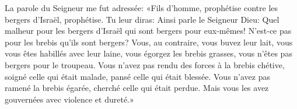 La parole du Seigneur me fut adressée:
	«Fils d’homme, prophétise contre les bergers d’Israël, prophétise.
Tu leur diras: Ainsi parle le Seigneur Dieu:
	Quel malheur pour les bergers d’Israël qui sont bergers pour eux-mêmes!
	N’est-ce pas pour les brebis qu’ils sont bergers?
Vous, au contraire, vous buvez leur lait, vous vous êtes habillés avec leur laine,
	vous égorgez les brebis grasses, vous n’êtes pas bergers pour le troupeau.
Vous n’avez pas rendu des forces à la brebis chétive,
	soigné celle qui était malade, pansé celle qui était blessée.
Vous n’avez pas ramené la brebis égarée, cherché celle qui était perdue.
	Mais vous les avez gouvernées avec violence et dureté.»
